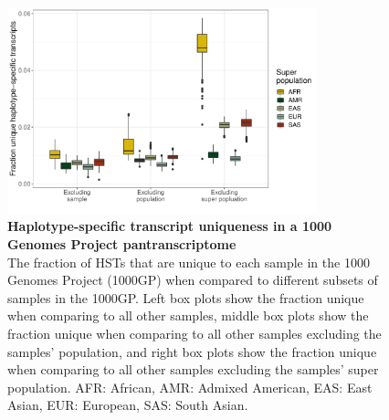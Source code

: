 \documentclass[11pt]{ucthesis}
\begin{document}
\begin{figure}[H]
\begin{center}
\includegraphics[width=0.8\textwidth]{mpmapfigures/figureS5.pdf}
\caption{\textbf{Haplotype-specific transcript uniqueness in a 1000 Genomes Project pantranscriptome} \\
The fraction of HSTs that are unique to each sample in the 1000 Genomes Project (1000GP) when compared to different subsets of samples in the 1000GP. Left box plots show the fraction unique when comparing to all other samples, middle box plots show the fraction unique when comparing to all other samples excluding the samples’ population, and right box plots show the fraction unique when comparing to all other samples excluding the samples’ super population. AFR: African, AMR: Admixed American, EAS: East Asian, EUR: European, SAS: South Asian.
} \label{fig:hst-populations}
\end{center}
\end{figure}
\end{document}
